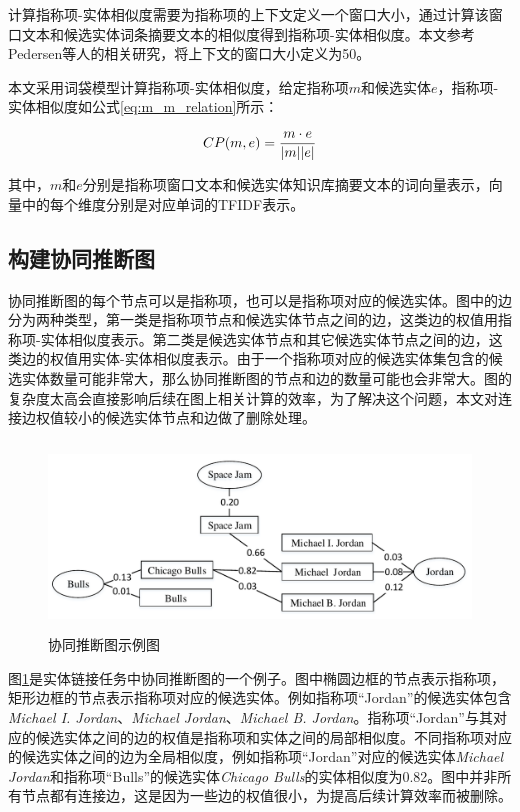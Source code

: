 计算指称项-实体相似度需要为指称项的上下文定义一个窗口大小，通过计算该窗口文本和候选实体词条摘要文本的相似度得到指称项-实体相似度。本文参考Pedersen等人\cite{pedersen2005name}的相关研究，将上下文的窗口大小定义为50。

本文采用词袋模型计算指称项-实体相似度，给定指称项$m$和候选实体$e$，指称项-实体相似度如公式\ref{eq:m_m_relation}所示：

\begin{equation}\label{eq:m_m_relation}
CP(m,e)=\frac{m\cdot e}{|m||e|}\\
\end{equation}

其中，$m$和$e$分别是指称项窗口文本和候选实体知识库摘要文本的词向量表示，向量中的每个维度分别是对应单词的TFIDF表示。

\subsection{构建协同推断图}\label{section:ref_graph}
协同推断图的每个节点可以是指称项，也可以是指称项对应的候选实体。图中的边分为两种类型，第一类是指称项节点和候选实体节点之间的边，这类边的权值用指称项-实体相似度表示。第二类是候选实体节点和其它候选实体节点之间的边，这类边的权值用实体-实体相似度表示。由于一个指称项对应的候选实体集包含的候选实体数量可能非常大，那么协同推断图的节点和边的数量可能也会非常大。图的复杂度太高会直接影响后续在图上相关计算的效率，为了解决这个问题，本文对连接边权值较小的候选实体节点和边做了删除处理。

\begin{figure}[!htb]
	\centering\includegraphics[height=5cm]{resource/EL_Graph}
	\caption{协同推断图示例图}
	\label{fig:el_graph}
\end{figure}

图\ref{fig:el_graph}是实体链接任务中协同推断图的一个例子。图中椭圆边框的节点表示指称项，矩形边框的节点表示指称项对应的候选实体。例如指称项“Jordan”的候选实体包含\textit{Michael I. Jordan}、\textit{Michael Jordan}、\textit{Michael B. Jordan}。指称项“Jordan”与其对应的候选实体之间的边的权值是指称项和实体之间的局部相似度。不同指称项对应的候选实体之间的边为全局相似度，例如指称项“Jordan”对应的候选实体\textit{Michael Jordan}和指称项“Bulls”的候选实体\textit{Chicago Bulls}的实体相似度为0.82。图中并非所有节点都有连接边，这是因为一些边的权值很小，为提高后续计算效率而被删除。

